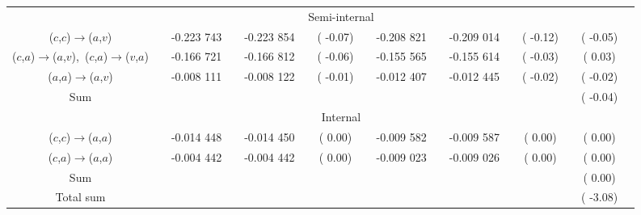 \documentclass[aip,jcp,amsmath]{revtex4-1}
\begin{document}
{\begin{figure}
\begin{longtable}[!ht]{cccccccccccccccc}
                                                                  && \multicolumn{10}{c}{Semi-internal} \\                 
($c$,$c$)$\rightarrow$($a$,$v$)                                   && -0.223 743  && -0.223 854  && (  -0.07)  && -0.208 821  && -0.209 014  && (  -0.12)  && (  -0.05)\\
($c$,$a$)$\rightarrow$($a$,$v$),\ ($c$,$a$)$\rightarrow$($v$,$a$) && -0.166 721  && -0.166 812  && (  -0.06)  && -0.155 565  && -0.155 614  && (  -0.03)  && (   0.03)\\
($a$,$a$)$\rightarrow$($a$,$v$)                                   && -0.008 111  && -0.008 122  && (  -0.01)  && -0.012 407  && -0.012 445  && (  -0.02)  && (  -0.02)\\
Sum                                                               &&             &&             &&            &&             &&             &&            && (  -0.04)\\
                                                                  && \multicolumn{10}{c}{Internal} \\                      
($c$,$c$)$\rightarrow$($a$,$a$)                                   && -0.014 448  && -0.014 450  && (   0.00)  && -0.009 582  && -0.009 587  && (   0.00)  && (   0.00)\\
($c$,$a$)$\rightarrow$($a$,$a$)                                   && -0.004 442  && -0.004 442  && (   0.00)  && -0.009 023  && -0.009 026  && (   0.00)  && (   0.00)\\
Sum                                                               &&             &&             &&            &&             &&             &&            && (   0.00)\\
Total sum                                                         &&             &&             &&            &&             &&             &&            && (  -3.08)\\
\hline
\hline
\end{longtable}
\end{figure}  

}

\clearpage
\end{document}
